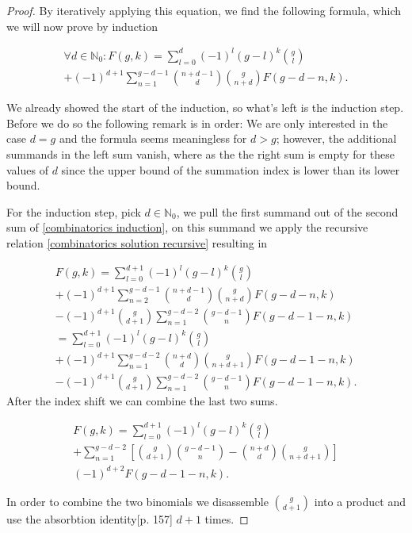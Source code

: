 \documentclass{article}
\theoremstyle{theorem}
\theoremstyle{definition}
\begin{document}
\begin{proof}
By iteratively applying this equation, we find the following formula, which we will now prove by induction

\begin{multline}\label{combinatorics induction}
\forall d\in\mathbb{N}_0: F(g,k)=\sum_{l=0}^d (-1)^l (g-l)^k \binom{g}{l}\\
+(-1)^{d+1} \sum_{n=1}^{g-d-1} \binom{n+d-1}{d} \binom{g}{n+d} F(g-d-n,k).
\end{multline}

We already showed the start of the induction, so what's left is the induction step. Before we do so the
following remark is in order: We are only interested in the case \(d=g\) and the formula seems meaningless
for \(d>g\); however, the additional summands in the left sum vanish, where as the the right sum is empty
for these values of \(d\) since the  upper bound of the summation index is lower than its lower bound.

For the induction step, pick \(d\in\mathbb{N}_0\), we pull the first summand out of the second sum 
of \eqref{combinatorics induction},
on this summand we apply the recursive relation \eqref{combinatorics solution recursive} resulting in

\begin{multline}
F(g,k)=\sum_{l=0}^{d+1} (-1)^l (g-l)^k \binom{g}{l}\\
+(-1)^{d+1} \sum_{n=2}^{g-d-1} \binom{n+d-1}{d} \binom{g}{n+d} F(g-d-n,k)\\
-(-1)^{d+1} \binom{g}{d+1} \sum_{n=1}^{g-d-2} \binom{g-d-1}{n} F(g-d-1-n,k)\\
=\sum_{l=0}^{d+1} (-1)^l (g-l)^k \binom{g}{l}\\
+(-1)^{d+1} \sum_{n=1}^{g-d-2} \binom{n+d}{d} \binom{g}{n+d+1} F(g-d-1-n,k)\\
-(-1)^{d+1} \binom{g}{d+1} \sum_{n=1}^{g-d-2} \binom{g-d-1}{n} F(g-d-1-n,k).
\end{multline}
After the index shift we can combine the last two sums. 

\begin{multline}
F(g,k)= \sum_{l=0}^{d+1} (-1)^l (g-l)^k \binom{g}{l}\\
+ \sum_{n=1}^{g-d-2}\left[\binom{g}{d+1} \binom{g-d-1}{n} - \binom{n+d}{d} \binom{g}{n+d+1} \right] 
\\(-1)^{d+2} F(g-d-1-n,k).
\end{multline}


In order to combine the two binomials we disassemble \(\binom{g}{d+1}\) into a product and use
the absorbtion identity\cite{graham1994concrete}[p. 157] \(d+1\) times.


\end{proof}
\end{document}
